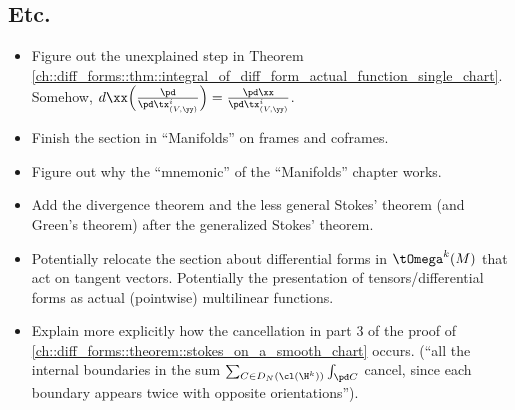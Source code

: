 \subsection*{Etc.}

\begin{itemize}
    
    \item Figure out the unexplained step in Theorem \ref{ch::diff_forms::thm::integral_of_diff_form_actual_function_single_chart}. Somehow, $d\xx \Big( \frac{\pd}{\pd \tx^i_{(V, \yy)}} \Big) = \frac{\pd \xx}{\pd \tx^i_{(V, \yy)}}$. 
    \item Finish the section in ``Manifolds'' on frames and coframes.
    \item Figure out why the ``mnemonic'' of the ``Manifolds'' chapter works.
    \item Add the divergence theorem and the less general Stokes' theorem (and Green's theorem) after the generalized Stokes' theorem.
    \item Potentially relocate the section about differential forms in $\tOmega^k(M)$ that act on tangent vectors. Potentially the presentation of  tensors/differential forms as actual (pointwise) multilinear functions.
    \item Explain more explicitly how the cancellation in part 3 of the proof of \ref{ch::diff_forms::theorem::stokes_on_a_smooth_chart} occurs. (``all the internal boundaries in the sum $\sum_{C \in D_N(\cl(\H^k))} \int_{\pd C}$ cancel, since each boundary appears twice with opposite orientations'').
\end{itemize}
